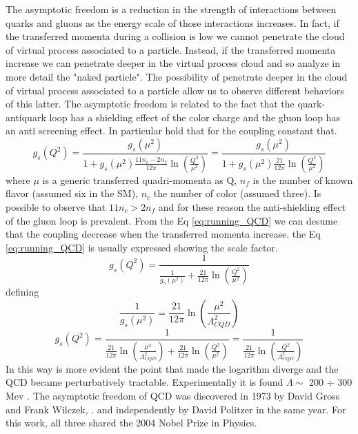 \documentclass[12pt,a4paper]{book}
\begin{document}
	The asymptotic freedom is a reduction in the strength of interactions between quarks and gluons as the energy scale of those interactions increases. In fact, if the transferred momenta during a collision is low we cannot penetrate the cloud of virtual process associated to a particle. Instead, if the transferred momenta increase we can penetrate deeper in the virtual process cloud and so analyze in more detail the "naked particle". The possibility of penetrate deeper in the cloud of virtual process associated to a particle allow us to observe different behaviors of this latter. The asymptotic freedom is related to the fact that the quark-antiquark loop has a shielding effect of the color charge and the gluon loop has an anti screening effect. In particular hold that for the coupling constant that.
	\begin{equation}
		g_s(Q^2)= \frac{g_s(\mu^2)}{1+g_s(\mu^2) \frac{11 n_c- 2n_f}{12\pi} \ln\left(\frac{Q^2}{\mu^2}\right)} = \frac{g_s(\mu^2)}{1+g_s(\mu^2) \frac{21}{12\pi} \ln\left(\frac{Q^2}{\mu^2}\right)}
		\label{eq:running_QCD}
	\end{equation}
	where $\mu$ is a generic transferred quadri-momenta as Q, $n_f$ is the number of known flavor (assumed six in the SM), $n_c$ the number of color (assumed three). Is possible to observe that $11n_c>2n_f$ and for these reason the anti-shielding effect of the gluon loop is prevalent. From the Eq \ref{eq:running_QCD} we can desume that the coupling decrease when the transferred momenta increase. the Eq \ref{eq:running_QCD} is usually expressed showing the scale factor. 
	\begin{equation}
		g_s(Q^2)= \frac{1}{\frac{1}{g_s(\mu^2)}+ \frac{21}{12\pi} \ln\left(\frac{Q^2}{\mu^2}\right)}
		\label{eq:running_QCD2}
	\end{equation} 
	defining 
	\begin{equation}
		\frac{1}{g_s(\mu^2)}= \frac{21}{12\pi} \ln\left(\frac{\mu^2}{\Lambda_{CQD}^2}\right)
	\end{equation} 
	\begin{equation}
		g_s(Q^2)=  \frac{1}{\frac{21}{12\pi} \ln\left(\frac{\mu^2}{\Lambda_{CQD}^2}\right)+ \frac{21}{12\pi} \ln\left(\frac{Q^2}{\mu^2}\right) }
		=\frac{1}{\frac{21}{12\pi} \ln \left(\frac{Q^2}{\Lambda_{CQD}^2}\right)}
		\label{eq:running_QCD_scale_factor}
	\end{equation} 
	In this way is more evident the point that made the logarithm diverge and the QCD became perturbatively tractable. Experimentally it is found $\Lambda \sim$ 200 $\div$ 300 Mev \cite{Semprini}. The asymptotic freedom of QCD was discovered in 1973 by David Gross and Frank Wilczek, \cite{DAVIDPOLITZER1974129}. and independently by David Politzer in the same year. For this work, all three shared the 2004 Nobel Prize in Physics.
\end{document}
